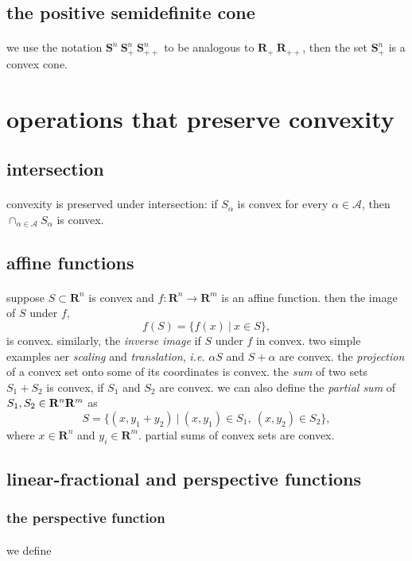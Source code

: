 \documentclass{article}
\begin{document}
  \subsection{the positive semidefinite cone}
    \paragraph{} we use the notation $\mathbf{S}^n\ \mathbf{S}_+^n\ \mathbf{S}_{++}^n$ to be analogous to $\mathbf{R}_+\ \mathbf{R}_{++}$, then the set $\mathbf{S}_+^n$ is a convex cone.
\section{operations that preserve convexity}
  \subsection{intersection}
    \paragraph{} convexity is preserved under intersection: if $S_\alpha$ is convex for every $\alpha \in \mathcal{A}$, then $\cap_{\alpha \in \mathcal{A}} S_\alpha$ is convex.
  \subsection{affine functions}
    \paragraph{} suppose $S \subset \mathbf{R}^n$ is convex and $f : \mathbf{R}^n \to \mathbf{R}^m$ is an affine function. then the image of $S$ under $f$,
    \begin{equation}
      f(S) = \{f(x)\ |\ x \in S\},
    \end{equation}
    is convex. similarly, the \textit{inverse image} if $S$ under $f$ in convex. two simple examples aer \textit{scaling} and \textit{translation}, \textit{i.e.} $\alpha S$ and $S + \alpha$ are convex. the \textit{projection} of a convex set onto some of its coordinates is convex. the \textit{sum} of two sets $S_1 + S_2$ is convex, if $S_1$ and $S_2$ are convex. we can also define the \textit{partial sum} of $S_1, S_2 \in \mathbf{R}^n \* \mathbf{R}^m$ as
    \begin{equation}
      S = \{(x, y_1 + y_2)\ |\ (x, y_1) \in S_1,\ (x, y_2) \in S_2\},
    \end{equation}
    where $x \in \mathbf{R}^n$ and $y_i \in \mathbf{R}^m$. partial sums of convex sets are convex.
  \subsection{linear-fractional and perspective functions}
    \subsubsection{the perspective function}
      \paragraph{} we define
\end{document}
